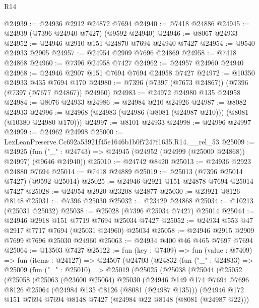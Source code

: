 \begin{lexlean}{R14}
\begin{coremodule}
@24939 := @24936 @2912 @24872 @7694
@24940 := @7418 @24886
@24945 := @24939 (@7396 @24940 @7427) (@9592 @24940)
@24946 := @8067 @24933
@24952 := @24946 @2910 @151 @24870 @7694 @24940 @7427
@24954 := @9540 @24933 @2905
@24957 := @24954 @2909 @7696 @24869
@24958 := @7418 @24868
@24960 := @7396 @24958 @7427
@24962 := @24957 @24960 @24940
@24968 := @24946 @2907 @151 @7694 @7694 @24958 @7427
@24972 := @10350 @24933 @435 @7694 @170
@24980 := @7396 (@7397 (@7673 @24867)) (@7396 (@7397 (@7677 @24867)) @24960)
@24983 := @24972 @24980 @135 @24958
@24984 := @8076 @24933
@24986 := @24984 @210 @24926
@24987 := @8082 @24933
@24996 := @24968 (@24983 (@24986 (@8081 (@24987 @210))) (@8081 (@10380 @24980 @170)))
@24997 := @8101 @24933
@24998 := @24996 @24997
@24999 := @24962 @24998
@25000 := LexLeanPreserve.Cc692a53921f45e1646b1b0f7247f1635.R14.__rel_53
@25009 := @24925
    (fun ("_" : @24743) => @24945 (@24952 (@24999 (@25000 @24868)) @24997) (@9646 @24940))
@25010 := @24742 @8420
@25013 := @24936 @2923 @24880 @7694
@25014 := @7418 @24889
@25019 := @25013 (@7396 @25014 @7427) (@9592 @25014)
@25025 := @24946 @2921 @151 @24878 @7694 @25014 @7427
@25028 := @24954 @2920 @23208 @24877
@25030 := @23921 @8126 @8148
@25031 := @7396 @25030
@25032 := @23429 @24868
@25034 := @10213 (@25031 @25032)
@25038 := @25028 (@7396 @25034 @7427) @25014
@25044 := @24946 @2918 @151 @7719 @7694 @25034 @7427
@25052 := @24934 @553 @47 @2917 @7717 @7694 (@25031 @24960) @25034
@25058 := @24946 @2915 @2909 @7699 @7696 @25030 @24960
@25063 := @24934 @400 @46 @465 @7697 @7694
@25064 := @13503 @7427
@25122 := fun (key : @7409) =>
  fun (value : @7409) =>
  fun (items : @24127) =>
  @24507
    (@24703
      (@24832
        (fun ("_" : @24833) =>
        @25009
          (fun ("_" : @25010) =>
          @25019
            (@25025
              (@25038
                (@25044
                  (@25052
                    (@25058
                      (@25063
                        (@23600 @25064)
                        @25030
                        (@24946
                          @149
                          @174
                          @7694
                          @7696
                          @8126
                          @25064
                          (@24984 @135 @8126 (@8081 (@24987 @135)))
                          (@24946
                            @172
                            @151
                            @7694
                            @7694
                            @8148
                            @7427
                            (@24984 @22 @8148 (@8081 (@24987 @22)))

\end{coremodule}
\end{lexlean}
